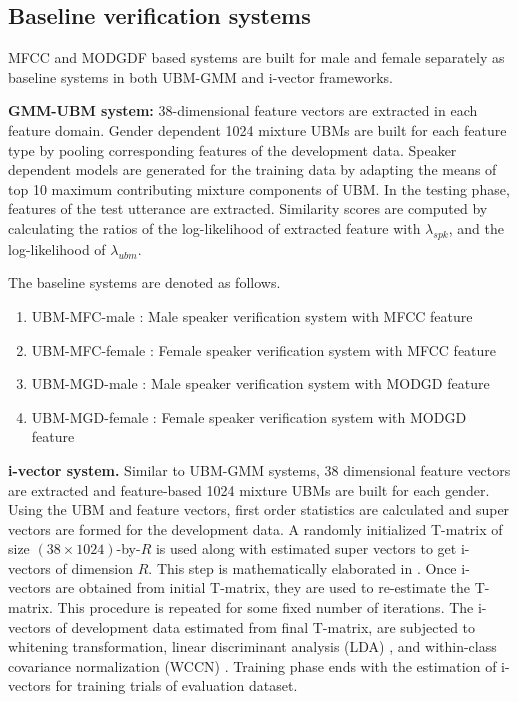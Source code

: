 \documentclass{article}
\begin{document}
\subsection{Baseline verification systems}
\label{subsec:baseline}
MFCC and MODGDF based systems are built for male and female separately as baseline systems in both UBM-GMM and i-vector frameworks.  

\vspace*{0.25cm}

\textbf{GMM-UBM system:} 38-dimensional feature vectors are extracted in each feature domain. Gender dependent 1024 mixture UBMs are built for each feature type by pooling corresponding features of the development data. Speaker dependent models are generated for the training data by adapting the means of top 10 maximum contributing mixture components of UBM. In the testing phase, features of the test utterance are extracted. Similarity scores are computed by calculating the ratios of the log-likelihood of extracted feature with $\lambda_{spk}$, and  the log-likelihood of $\lambda_{ubm}$. 

The baseline systems are denoted as follows.
\begin{enumerate}
\item UBM-MFC-male : Male speaker verification system with MFCC feature
\item UBM-MFC-female : Female speaker verification system with MFCC feature
\item UBM-MGD-male : Male speaker verification system with MODGD feature
\item UBM-MGD-female : Female speaker verification system with MODGD feature
\end{enumerate}

\textbf{i-vector system.} 
Similar to UBM-GMM systems, 38 dimensional feature vectors are extracted and feature-based 1024 mixture UBMs are built for each gender.  Using the UBM and feature vectors, first order statistics are calculated and super vectors are formed for the development data. A randomly initialized T-matrix of size $(38\times1024)$-by-$R$ is used along with estimated super vectors to get i-vectors of dimension $R$. This step is mathematically elaborated in \cite{dehak_ivector, kenny_JFA}. Once i-vectors are obtained from initial T-matrix, they are used to re-estimate the T-matrix. This procedure is repeated for some fixed number of iterations. The  i-vectors of development data estimated from final T-matrix, are subjected to whitening transformation, linear discriminant analysis (LDA) \cite{lda, lda_tutorial}, and within-class covariance normalization (WCCN) \cite{dehak_ivector, wccn}. Training phase ends with the estimation of i-vectors for training trials of evaluation dataset. 
\end{document}
